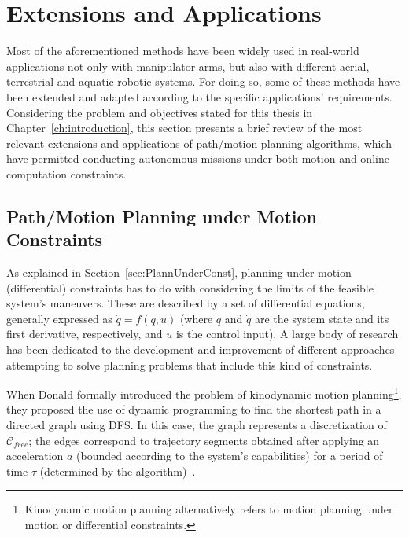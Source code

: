 \section{Extensions and Applications}
\label{sec:ExtensionsApplications}

Most of the aforementioned methods have been widely used in real-world
applications not only with manipulator arms, but also with different aerial,
terrestrial and aquatic robotic systems. For doing so, some of these methods
have been extended and adapted according to the specific applications'
requirements. Considering the problem and objectives stated for this thesis in
Chapter~\ref{ch:introduction}, this section presents a brief review of the most
relevant extensions and applications of path/motion planning algorithms, which
have permitted conducting autonomous missions under both motion and online
computation constraints.

\subsection{Path/Motion Planning under Motion Constraints}
\label{sec:motion_constraints_review}

As explained in Section~\ref{sec:PlannUnderConst}, planning under motion
(differential) constraints has to do with considering the limits of the feasible
system's maneuvers. These are described by a set of differential equations,
generally expressed as $\dot{q}=f\left(q,u\right)$ (where $q$ and $\dot{q}$ are
the system state and its first derivative, respectively, and $u$ is the control
input). A large body of research has been dedicated to the development and
improvement of different approaches attempting to solve planning problems that
include this kind of constraints.

When Donald \etal formally introduced the problem of kinodynamic motion
planning\footnote{Kinodynamic motion planning alternatively refers to motion
planning under motion or differential constraints.}, they proposed the use of
dynamic programming to find the shortest path in a directed graph using
\ac{DFS}. In this case, the graph represents a discretization of
$\mathcal{C}_{free}$; the edges correspond to trajectory segments obtained after
applying an acceleration $a$ (bounded according to the system's capabilities)
for a period of time $\tau$ (determined by the algorithm)~\cite{Donald1993}.

